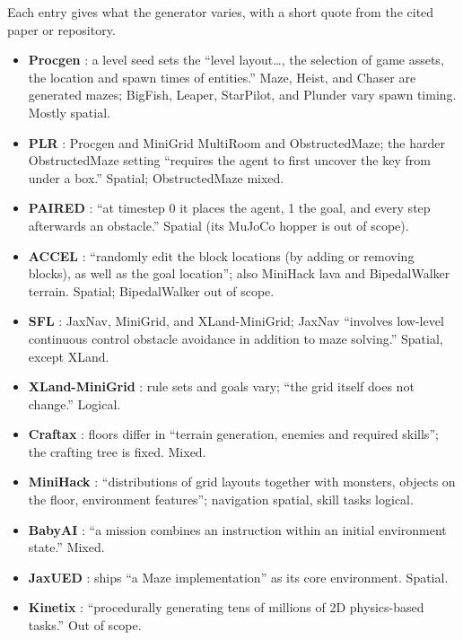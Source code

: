 \documentclass[twoside]{article}
\begin{document}
Each entry gives what the generator varies, with a short quote from the cited paper or repository.
\begin{itemize}[leftmargin=*, itemsep=2pt]
\item \textbf{Procgen} \citep{cobbe2020leveraging}: a level seed sets the ``level layout\ldots, the selection of game assets, the location and spawn times of entities.'' Maze, Heist, and Chaser are generated mazes; BigFish, Leaper, StarPilot, and Plunder vary spawn timing. Mostly spatial.
\item \textbf{PLR} \citep{jiang2021prioritized}: Procgen and MiniGrid MultiRoom and ObstructedMaze; the harder ObstructedMaze setting ``requires the agent to first uncover the key from under a box.'' Spatial; ObstructedMaze mixed.
\item \textbf{PAIRED} \citep{dennis2020emergent}: ``at timestep 0 it places the agent, 1 the goal, and every step afterwards an obstacle.'' Spatial (its MuJoCo hopper is out of scope).
\item \textbf{ACCEL} \citep{parker2022evolving}: ``randomly edit the block locations (by adding or removing blocks), as well as the goal location''; also MiniHack lava and BipedalWalker terrain. Spatial; BipedalWalker out of scope.
\item \textbf{SFL} \citep{rutherford2024no}: JaxNav, MiniGrid, and XLand-MiniGrid; JaxNav ``involves low-level continuous control obstacle avoidance in addition to maze solving.'' Spatial, except XLand.
\item \textbf{XLand-MiniGrid} \citep{nikulin2024xland}: rule sets and goals vary; ``the grid itself does not change.'' Logical.
\item \textbf{Craftax} \citep{matthews2024craftax}: floors differ in ``terrain generation, enemies and required skills''; the crafting tree is fixed. Mixed.
\item \textbf{MiniHack} \citep{samvelyan2021minihack}: ``distributions of grid layouts together with monsters, objects on the floor, environment features''; navigation spatial, skill tasks logical.
\item \textbf{BabyAI} \citep{chevalier2018babyai}: ``a mission combines an instruction within an initial environment state.'' Mixed.
\item \textbf{JaxUED} \citep{coward2024jaxued}: ships ``a Maze implementation'' as its core environment. Spatial.
\item \textbf{Kinetix} \citep{matthews2025kinetix}: ``procedurally generating tens of millions of 2D physics-based tasks.'' Out of scope.
\end{itemize}
\end{document}
